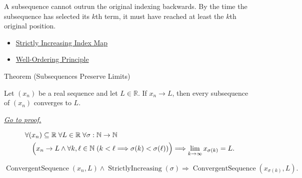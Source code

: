 \begin{remark*}[Interpretation]
A subsequence cannot outrun the original indexing backwards. By the time the
subsequence has selected its $k$th term, it must have reached at least the
$k$th original position.
\end{remark*}

\begin{dependencies}
\begin{itemize}
  \item \hyperref[def:strictly-increasing-index-map]{Strictly Increasing Index Map}
  \item \hyperref[thm:well-ordering-principle]{Well-Ordering Principle}
\end{itemize}
\end{dependencies}


\begin{theorembox}{Theorem (Subsequences Preserve Limits)}
\begin{theorem}
\label{thm:subsequences-preserve-limits}
Let $(x_n)$ be a real sequence and let $L\in\mathbb{R}$. If $x_n\to L$,
then every subsequence of $(x_n)$ converges to $L$.

\smallskip
\noindent
\hyperref[prf:subsequences-preserve-limits]{\textit{Go to proof.}}
\end{theorem}
\end{theorembox}

\begin{remark*}
\[
\begin{aligned}
&\forall (x_n)\subseteq\mathbb{R}\;\forall L\in\mathbb{R}\;
\forall \sigma:\mathbb{N}\to\mathbb{N}\\
&\quad\Bigl(
  x_n\to L
  \land
  \forall k,\ell\in\mathbb{N}\;(k<\ell\Longrightarrow\sigma(k)<\sigma(\ell))
\Bigr)
\Longrightarrow
\lim_{k\to\infty}x_{\sigma(k)}=L.
\end{aligned}
\]
\end{remark*}

\begin{remark*}
\[
\operatorname{ConvergentSequence}(x_n,L)
\land
\operatorname{StrictlyIncreasing}(\sigma)
\Longrightarrow
\operatorname{ConvergentSequence}(x_{\sigma(k)},L).
\]
\end{remark*}


